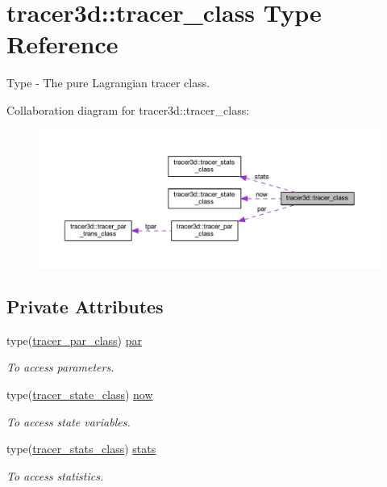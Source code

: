 \hypertarget{structtracer3d_1_1tracer__class}{}\section{tracer3d\+:\+:tracer\+\_\+class Type Reference}
\label{structtracer3d_1_1tracer__class}


Type -\/ The pure Lagrangian tracer class.  




Collaboration diagram for tracer3d\+:\+:tracer\+\_\+class\+:\nopagebreak
\begin{figure}[H]
\begin{center}
\leavevmode
\includegraphics[width=350pt]{structtracer3d_1_1tracer__class__coll__graph}
\end{center}
\end{figure}
\subsection*{Private Attributes}
\begin{DoxyCompactItemize}
\item 
type(\mbox{\hyperlink{structtracer3d_1_1tracer__par__class}{tracer\+\_\+par\+\_\+class}}) \mbox{\hyperlink{structtracer3d_1_1tracer__class_a3745c68bd31158518852af7839b5d25d}{par}}
\begin{DoxyCompactList}\small\item\em To access parameters. \end{DoxyCompactList}\item 
type(\mbox{\hyperlink{structtracer3d_1_1tracer__state__class}{tracer\+\_\+state\+\_\+class}}) \mbox{\hyperlink{structtracer3d_1_1tracer__class_a9078a3dd8dfd7a789277f35549d31ff6}{now}}
\begin{DoxyCompactList}\small\item\em To access state variables. \end{DoxyCompactList}\item 
type(\mbox{\hyperlink{structtracer3d_1_1tracer__stats__class}{tracer\+\_\+stats\+\_\+class}}) \mbox{\hyperlink{structtracer3d_1_1tracer__class_a7145b520dad5b862da8b0fc14da0a8f0}{stats}}
\begin{DoxyCompactList}\small\item\em To access statistics. \end{DoxyCompactList}\end{DoxyCompactItemize}


